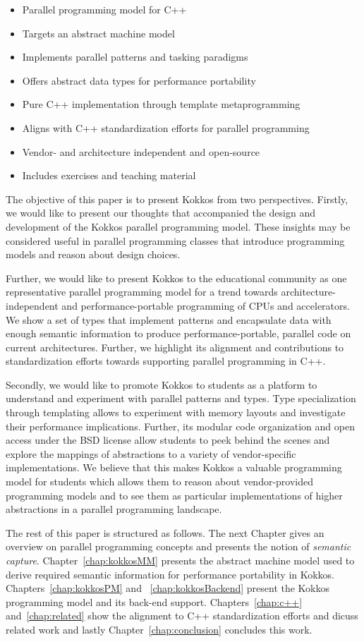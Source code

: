 \begin{itemize}
\item Parallel programming model for C++
\item Targets an abstract machine model
\item Implements parallel patterns and tasking paradigms
\item Offers abstract data types for performance portability
\item Pure C++ implementation through template metaprogramming
\item Aligns with C++ standardization efforts for parallel programming
\item Vendor- and architecture independent and open-source
\item Includes exercises and teaching material
\end{itemize}

The objective of this paper is to present Kokkos from two perspectives. Firstly, we would like to present our thoughts that accompanied the design and development of the Kokkos parallel programming model. These insights may be considered useful in parallel programming classes that introduce programming models and reason about design choices.

Further, we would like to present Kokkos to the educational community as one representative parallel programming model for a trend towards architecture-independent and performance-portable programming of CPUs and accelerators. We show a set of types that implement patterns and encapsulate data with enough semantic information to produce performance-portable, parallel code on current architectures. Further, we highlight its alignment and contributions to standardization efforts towards supporting parallel programming in C++. 

Secondly, we would like to promote Kokkos to students as a platform to understand and experiment with parallel patterns and types. Type specialization through templating allows to experiment with memory layouts and investigate their performance implications. Further, its modular code organization and open access under the BSD license allow students to peek behind the scenes and explore the mappings of abstractions to a variety of vendor-specific implementations. We believe that this makes Kokkos a valuable programming model for students which allows them to reason about vendor-provided programming models and to see them as particular implementations of higher abstractions in a parallel programming landscape.

The rest of this paper is structured as follows. The next Chapter gives an overview on parallel programming concepts and presents the notion of \emph{semantic capture}. Chapter~\ref{chap:kokkosMM} presents the abstract machine model used to derive required semantic information for performance portability in Kokkos. Chapters~\ref{chap:kokkosPM} and ~\ref{chap:kokkosBackend} present the Kokkos programming model and its back-end support. Chapters~\ref{chap:c++} and~\ref{chap:related} show the alignment to C++ standardization efforts and dicuss related work and lastly Chapter~\ref{chap:conclusion} concludes this work.
